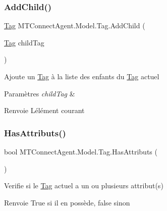 \subsubsection{\texorpdfstring{Add\+Child()}{AddChild()}}
{\footnotesize\ttfamily \mbox{\hyperlink{class_m_t_connect_agent_1_1_model_1_1_tag}{Tag}} M\+T\+Connect\+Agent.\+Model.\+Tag.\+Add\+Child (\begin{DoxyParamCaption}\item[{\mbox{\hyperlink{class_m_t_connect_agent_1_1_model_1_1_tag}{Tag}}}]{child\+Tag }\end{DoxyParamCaption})\hspace{0.3cm}{\ttfamily [inline]}}



Ajoute un \mbox{\hyperlink{class_m_t_connect_agent_1_1_model_1_1_tag}{Tag}} à la liste des enfants du \mbox{\hyperlink{class_m_t_connect_agent_1_1_model_1_1_tag}{Tag}} actuel 


\begin{DoxyParams}{Paramètres}
{\em child\+Tag} & \\
\hline
\end{DoxyParams}
\begin{DoxyReturn}{Renvoie}
L\textquotesingle{}élément courant
\end{DoxyReturn}
\mbox{\label{class_m_t_connect_agent_1_1_model_1_1_tag_a46dc1cce56e5d17f1826fdc53045f6ff}} 
\subsubsection{\texorpdfstring{Has\+Attributs()}{HasAttributs()}}
{\footnotesize\ttfamily bool M\+T\+Connect\+Agent.\+Model.\+Tag.\+Has\+Attributs (\begin{DoxyParamCaption}{ }\end{DoxyParamCaption})\hspace{0.3cm}{\ttfamily [inline]}}



Verifie si le \mbox{\hyperlink{class_m_t_connect_agent_1_1_model_1_1_tag}{Tag}} actuel a un ou plusieurs attribut(s) 

\begin{DoxyReturn}{Renvoie}
True si il en possède, false sinon
\end{DoxyReturn}
\mbox{\label{class_m_t_connect_agent_1_1_model_1_1_tag_a0c2f62177d2c1c2db233e2adaef5a54c}} 
